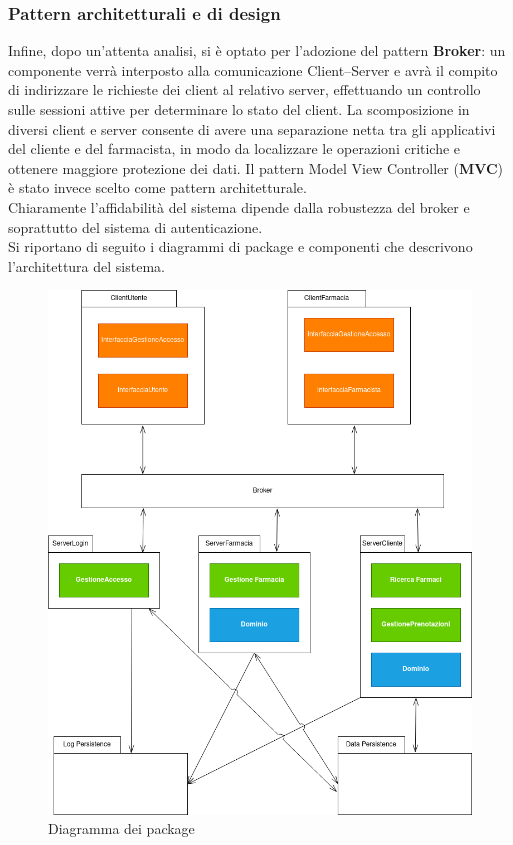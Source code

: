 \subsubsection{Pattern architetturali e di design}

Infine, dopo un'attenta analisi, si è optato per l'adozione del pattern \textbf{Broker}: 
un componente verrà interposto alla comunicazione Client--Server e avrà il compito di indirizzare le richieste dei client al relativo server, 
effettuando un controllo sulle sessioni attive per determinare lo stato del client. 
La scomposizione in diversi client e server consente di avere una separazione netta tra gli applicativi del cliente e del farmacista, 
in modo da localizzare le operazioni critiche e ottenere maggiore protezione dei dati.
Il pattern Model View Controller (\textbf{MVC}) è stato invece scelto come pattern architetturale.
\\
Chiaramente l'affidabilità del sistema dipende dalla robustezza del broker e soprattutto del sistema di autenticazione.
\\
Si riportano di seguito i diagrammi di package e componenti che descrivono l'architettura del sistema.

\newpage

\begin{figure}[h!]
    \begin{center}
        \includegraphics[width=\textwidth]{immagini/Package-progettazione.png}
        \caption{Diagramma dei package}
    \end{center}
\end{figure}

